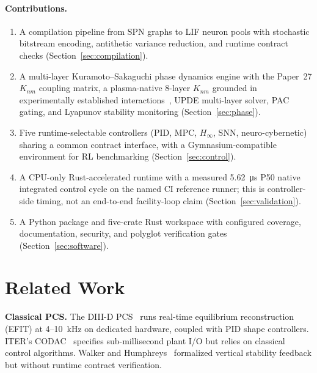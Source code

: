 \documentclass[twocolumn,preprintnumbers,amsmath,amssymb,prl,floatfix]{revtex4-2}
\begin{document}
\paragraph{Contributions.}
\begin{enumerate}
  \item A compilation pipeline from SPN graphs to LIF neuron pools
        with stochastic bitstream encoding, antithetic variance
        reduction, and runtime contract checks
        (Section~\ref{sec:compilation}).
  \item A multi-layer Kuramoto--Sakaguchi phase dynamics engine with
        the Paper~27 $K_{nm}$ coupling matrix, a plasma-native
        8-layer $K_{nm}$ grounded in experimentally established
        interactions~\cite{diamond2005,terry2000,lahaye2006,porcelli1996},
        UPDE multi-layer solver, PAC gating, and Lyapunov stability
        monitoring (Section~\ref{sec:phase}).
  \item Five runtime-selectable controllers (PID, MPC, $H_\infty$,
        SNN, neuro-cybernetic) sharing a common contract interface,
        with a Gymnasium-compatible environment for RL benchmarking
        (Section~\ref{sec:control}).
  \item A CPU-only Rust-accelerated runtime with a measured
        \SI{5.62}{\micro\second} P50 native integrated control cycle on the
        named CI reference runner; this is controller-side timing, not an
        end-to-end facility-loop claim (Section~\ref{sec:validation}).
  \item A Python package and five-crate Rust workspace with configured
        coverage, documentation, security, and polyglot verification gates
        (Section~\ref{sec:software}).
\end{enumerate}


\section{Related Work}
\label{sec:related}

\textbf{Classical PCS.}\quad
The DIII-D PCS~\cite{ferron1998} runs real-time equilibrium
reconstruction (EFIT) at 4--10~kHz on dedicated hardware, coupled with
PID shape controllers.  ITER's CODAC~\cite{iter_codac} specifies
sub-millisecond plant I/O but relies on classical control algorithms.
Walker and Humphreys~\cite{walker2020} formalized vertical stability
feedback but without runtime contract verification.
\end{document}

